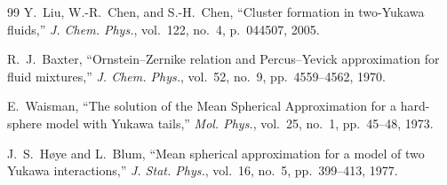 \documentclass[11pt,a4paper]{article}
\begin{document}
\begin{thebibliography}{99}
Y.~Liu, W.-R.~Chen, and S.-H.~Chen, ``Cluster formation in two-Yukawa fluids,'' \textit{J. Chem. Phys.}, vol.~122, no.~4, p.~044507, 2005.

R.~J.~Baxter, ``Ornstein--Zernike relation and Percus--Yevick approximation for fluid mixtures,'' \textit{J. Chem. Phys.}, vol.~52, no.~9, pp.~4559--4562, 1970.

E.~Waisman, ``The solution of the Mean Spherical Approximation for a hard-sphere model with Yukawa tails,'' \textit{Mol. Phys.}, vol.~25, no.~1, pp.~45--48, 1973.

J.~S.~H{\o}ye and L.~Blum, ``Mean spherical approximation for a model of two Yukawa interactions,'' \textit{J. Stat. Phys.}, vol.~16, no.~5, pp.~399--413, 1977.
\end{thebibliography}
\end{document}
